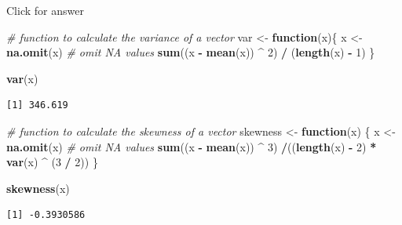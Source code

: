 \documentclass[
]{book}
\newenvironment{Shaded}{\begin{snugshade}}{\end{snugshade}}
\newcommand{\CommentTok}[1]{\textcolor[rgb]{0.56,0.35,0.01}{\textit{#1}}}
\newcommand{\ControlFlowTok}[1]{\textcolor[rgb]{0.13,0.29,0.53}{\textbf{#1}}}
\newcommand{\DecValTok}[1]{\textcolor[rgb]{0.00,0.00,0.81}{#1}}
\newcommand{\FunctionTok}[1]{\textcolor[rgb]{0.13,0.29,0.53}{\textbf{#1}}}
\newcommand{\NormalTok}[1]{#1}
\newcommand{\OtherTok}[1]{\textcolor[rgb]{0.56,0.35,0.01}{#1}}
\newcommand{\SpecialCharTok}[1]{\textcolor[rgb]{0.81,0.36,0.00}{\textbf{#1}}}
\begin{document}
Click for answer

\begin{Shaded}
\begin{Highlighting}[]
\CommentTok{\# function to calculate the variance of a vector}
\NormalTok{var }\OtherTok{\textless{}{-}} \ControlFlowTok{function}\NormalTok{(x)\{}
\NormalTok{  x }\OtherTok{\textless{}{-}} \FunctionTok{na.omit}\NormalTok{(x) }\CommentTok{\# omit NA values}
  \FunctionTok{sum}\NormalTok{((x }\SpecialCharTok{{-}} \FunctionTok{mean}\NormalTok{(x)) }\SpecialCharTok{\^{}} \DecValTok{2}\NormalTok{) }\SpecialCharTok{/}\NormalTok{ (}\FunctionTok{length}\NormalTok{(x) }\SpecialCharTok{{-}} \DecValTok{1}\NormalTok{)}
\NormalTok{\}}
\end{Highlighting}
\end{Shaded}

\begin{Shaded}
\begin{Highlighting}[]
\FunctionTok{var}\NormalTok{(x)}
\end{Highlighting}
\end{Shaded}

\begin{verbatim}
[1] 346.619
\end{verbatim}

\begin{Shaded}
\begin{Highlighting}[]
\CommentTok{\# function to calculate the skewness of a vector}
\NormalTok{skewness }\OtherTok{\textless{}{-}} \ControlFlowTok{function}\NormalTok{(x) \{}
\NormalTok{  x }\OtherTok{\textless{}{-}} \FunctionTok{na.omit}\NormalTok{(x) }\CommentTok{\# omit NA values}
  \FunctionTok{sum}\NormalTok{((x }\SpecialCharTok{{-}} \FunctionTok{mean}\NormalTok{(x)) }\SpecialCharTok{\^{}} \DecValTok{3}\NormalTok{) }\SpecialCharTok{/}\NormalTok{((}\FunctionTok{length}\NormalTok{(x) }\SpecialCharTok{{-}} \DecValTok{2}\NormalTok{) }\SpecialCharTok{*} \FunctionTok{var}\NormalTok{(x) }\SpecialCharTok{\^{}}\NormalTok{ (}\DecValTok{3} \SpecialCharTok{/} \DecValTok{2}\NormalTok{))}
\NormalTok{\}}
\end{Highlighting}
\end{Shaded}

\begin{Shaded}
\begin{Highlighting}[]
\FunctionTok{skewness}\NormalTok{(x)}
\end{Highlighting}
\end{Shaded}

\begin{verbatim}
[1] -0.3930586
\end{verbatim}
\end{document}
